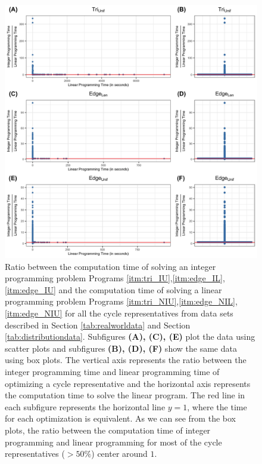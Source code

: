 \documentclass[utf8]{formatting_stuff/frontiersFPHY}
\newcommand{\se}{Section }
\theoremstyle{plain}
\theoremstyle{definition}
\begin{document}
\begin{figure}[h!]
\begin{center}
\includegraphics[width=\textwidth]{figures/IPvsLP.jpg} 
\end{center}
 \caption{ 
 Ratio between the computation time of solving an integer programming problem Programs \ref{itm:tri_IU},\ref{itm:edge_IL}, \ref{itm:edge_IU} and the computation time of solving a linear programming problem Programs \ref{itm:tri_NIU},\ref{itm:edge_NIL}, \ref{itm:edge_NIU} for all the cycle representatives from data sets described in \se \ref{tab:realworldata} and \se \ref{tab:distributiondata}. Subfigures  \textbf{(A), (C), (E)} plot the data using scatter plots and subfigures  \textbf{(B), (D), (F)} show the same data using box plots. The vertical axis represents the ratio between the integer programming time and linear programming time of optimizing a cycle representative and the horizontal axis represents the computation time to solve the linear program. The red line in each subfigure represents the horizontal line $y=1$, where the time for each optimization is equivalent. As we can see from the box plots, the ratio between the computation time of integer programming and linear programming for most of the cycle representatives ($>50\%$) center around $1$.}\label{fig:lp_mip_ratio_df}
\end{figure}
\end{document}
